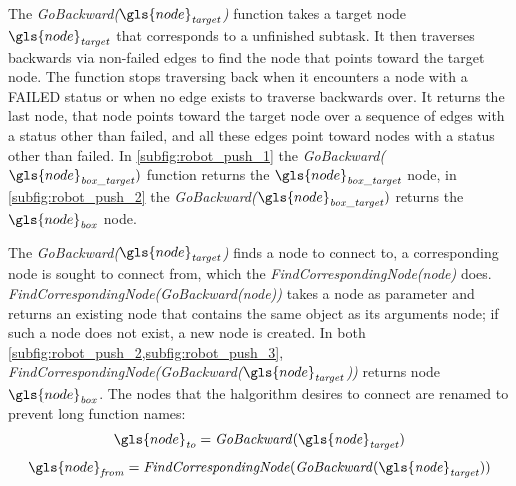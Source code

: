 The \textit{GoBackward($\gls{node}_\mathit{target}$)} function takes a target node $\gls{node}_\mathit{target}$ that corresponds to a unfinished subtask. It then traverses backwards via non-failed edges to find the node that points toward the target node. The function stops traversing back when it encounters a node with a FAILED status or when no edge exists to traverse backwards over. It returns the last node, that node points toward the target node over a sequence of edges with a status other than failed, and all these edges point toward nodes with a status other than failed. In \cref{subfig:robot_push_1} the \textit{GoBackward($\gls{node}_\mathit{box\_target})$} function returns the $\gls{node}_\mathit{box\_target}$ node, in \cref{subfig:robot_push_2} the \textit{GoBackward($\gls{node}_\mathit{box\_target})$} returns the $\gls{node}_\mathit{box}$ node.\bs

The \textit{GoBackward($\gls{node}_\mathit{target}$)} finds a node to connect to, a corresponding node is sought to connect from, which the \textit{FindCorrespondingNode(\gls{node})} does. \textit{FindCorrespondingNode(GoBackward(\gls{node}))} takes a node as parameter and returns an existing node that contains the same object as its arguments node; if such a node does not exist, a new node is created. In both \cref{subfig:robot_push_2,subfig:robot_push_3}, \textit{FindCorrespondingNode(GoBackward($\gls{node}_\mathit{target}$))} returns node $\gls{node}_\mathit{box}$. The nodes that the \ac{halgorithm} desires to connect are renamed to prevent long function names: 
\[\gls{node}_\mathit{to} =  \mathit{GoBackward(\gls{node}_\mathit{target})}\]
\[\gls{node}_\mathit{from} = \mathit{FindCorrespondingNode(GoBackward(\gls{node}_\mathit{target}))}\]

